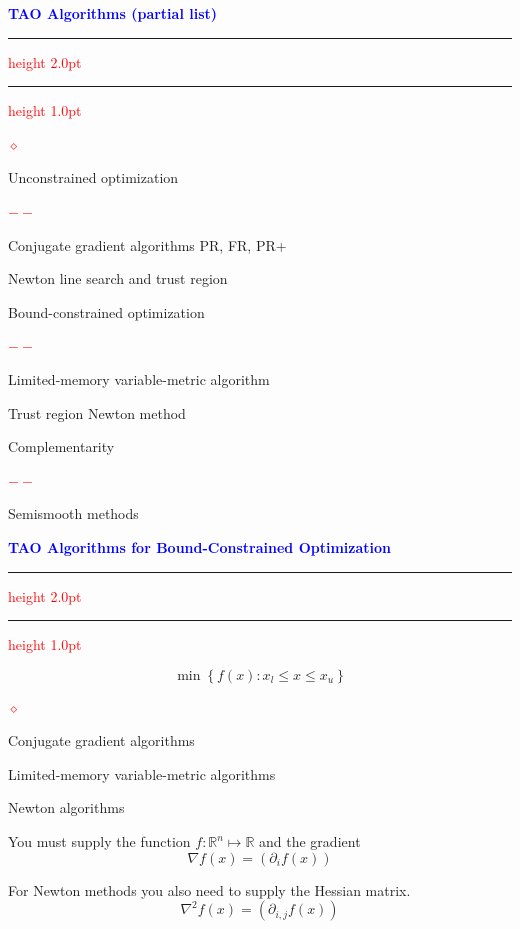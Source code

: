\documentclass{seminar}
\newcommand{\R}{\mbox{${\mathbb R}$}}
\newcommand{\grad}{\nabla}
\newcommand{\reddash}{\textcolor{red}{$--$}}
\newcommand{\reddiamond}{\textcolor{red}{$\diamond$}}
\newcommand{\redstripe}{\textcolor{red}{\hrule height 2.0pt\hfil}
             \vspace{-1.8pt}
             \textcolor{red}{\hrule height 1.0pt\hfil}
}
\newcommand{\heading}[1]{%
   \centerline{\textcolor{blue}{\textbf{#1}}}%
    \redstripe%
    \bigskip
}
\begin{document}
\begin{slide}

\heading{TAO Algorithms (partial list)}

\begin{list}{\reddiamond}
{ \setlength{\itemsep}{0pt}}
\item
Unconstrained optimization 
\begin{list}{\reddash}{}
\item
Conjugate gradient algorithms PR, FR, PR+
\item
Newton line search and trust region
\end{list}
\item
Bound-constrained optimization
\begin{list}{\reddash}{}
\item
Limited-memory variable-metric algorithm
\item
Trust region Newton method
\end{list}

\item Complementarity
\begin{list}{\reddash}{}
\item Semismooth methods
\end{list}
\end{list}

\vfill

\end{slide}

\begin{slide}

\heading{TAO Algorithms for Bound-Constrained Optimization}

\[
\min \left \{  f(x) : x_l \le x \le x_u \right \}
\]

\medskip

\begin{list}{\reddiamond}{}
\item
Conjugate gradient algorithms
\item
Limited-memory variable-metric algorithms
\item
Newton algorithms
\end{list}

You must supply the function $ f : \R^n \mapsto \R $ and the
gradient 
\[
\grad f (x) = \left ( \partial _i f(x) \right )
\]

For Newton methods you also need to supply the Hessian matrix.
\[
\grad^2 f (x) = \left ( \partial_{i,j} f(x) \right )
\]

\vfill

\end{slide}
\end{document}
